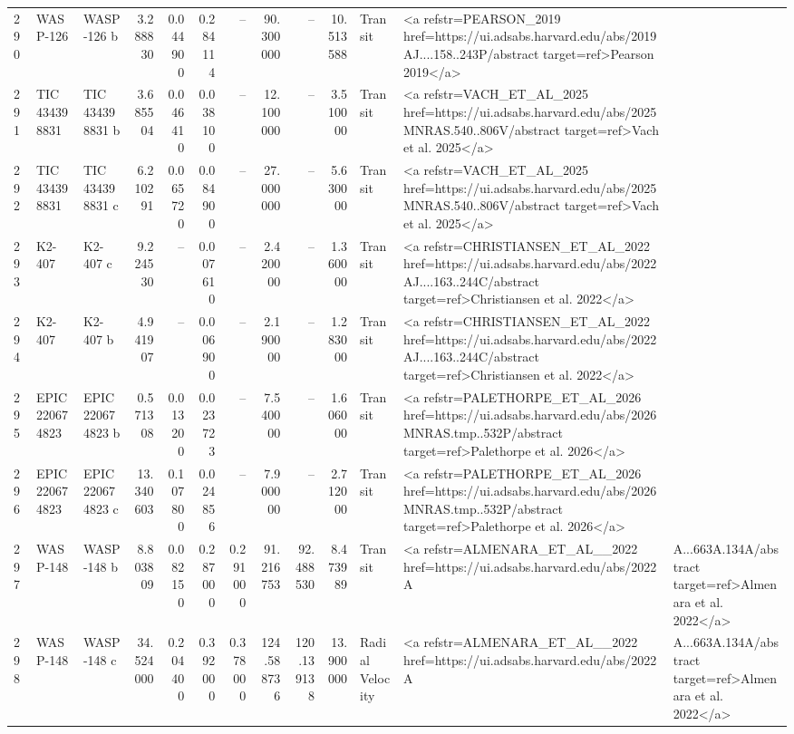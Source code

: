 \begin{tabular}{lllrrrrrrrll}
290 & WASP-126 & WASP-126 b & 3.288830 & 0.044900 & 0.284114 & -- & 90.300000 & -- & 10.513588 & Transit & <a refstr=PEARSON_2019 href=https://ui.adsabs.harvard.edu/abs/2019AJ....158..243P/abstract target=ref>Pearson 2019</a> \\
291 & TIC 434398831 & TIC 434398831 b & 3.685504 & 0.046410 & 0.038100 & -- & 12.100000 & -- & 3.510000 & Transit & <a refstr=VACH_ET_AL_2025 href=https://ui.adsabs.harvard.edu/abs/2025MNRAS.540..806V/abstract target=ref>Vach et al. 2025</a> \\
292 & TIC 434398831 & TIC 434398831 c & 6.210291 & 0.065720 & 0.084900 & -- & 27.000000 & -- & 5.630000 & Transit & <a refstr=VACH_ET_AL_2025 href=https://ui.adsabs.harvard.edu/abs/2025MNRAS.540..806V/abstract target=ref>Vach et al. 2025</a> \\
293 & K2-407 & K2-407 c & 9.224530 & -- & 0.007610 & -- & 2.420000 & -- & 1.360000 & Transit & <a refstr=CHRISTIANSEN_ET_AL_2022 href=https://ui.adsabs.harvard.edu/abs/2022AJ....163..244C/abstract target=ref>Christiansen et al. 2022</a> \\
294 & K2-407 & K2-407 b & 4.941907 & -- & 0.006900 & -- & 2.190000 & -- & 1.283000 & Transit & <a refstr=CHRISTIANSEN_ET_AL_2022 href=https://ui.adsabs.harvard.edu/abs/2022AJ....163..244C/abstract target=ref>Christiansen et al. 2022</a> \\
295 & EPIC 220674823 & EPIC 220674823 b & 0.571308 & 0.013200 & 0.023723 & -- & 7.540000 & -- & 1.606000 & Transit & <a refstr=PALETHORPE_ET_AL_2026 href=https://ui.adsabs.harvard.edu/abs/2026MNRAS.tmp..532P/abstract target=ref>Palethorpe et al. 2026</a> \\
296 & EPIC 220674823 & EPIC 220674823 c & 13.340603 & 0.107800 & 0.024856 & -- & 7.900000 & -- & 2.712000 & Transit & <a refstr=PALETHORPE_ET_AL_2026 href=https://ui.adsabs.harvard.edu/abs/2026MNRAS.tmp..532P/abstract target=ref>Palethorpe et al. 2026</a> \\
297 & WASP-148 & WASP-148 b & 8.803809 & 0.082150 & 0.287000 & 0.291000 & 91.216753 & 92.488530 & 8.473989 & Transit & <a refstr=ALMENARA_ET_AL__2022 href=https://ui.adsabs.harvard.edu/abs/2022A&A...663A.134A/abstract target=ref>Almenara et al. 2022</a> \\
298 & WASP-148 & WASP-148 c & 34.524000 & 0.204400 & 0.392000 & 0.378000 & 124.588736 & 120.139138 & 13.900000 & Radial Velocity & <a refstr=ALMENARA_ET_AL__2022 href=https://ui.adsabs.harvard.edu/abs/2022A&A...663A.134A/abstract target=ref>Almenara et al. 2022</a> \\

\end{tabular}
